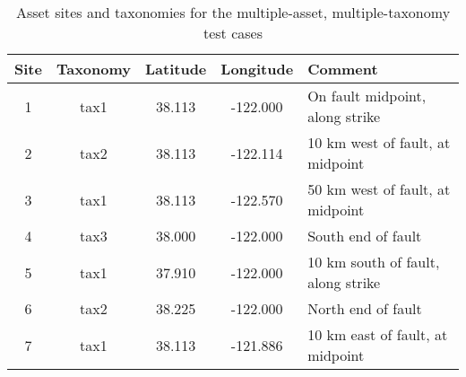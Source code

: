\begin{table}

\centering
\begin{tabular}{ c c c c l }

\hline
\rowcolor{anti-flashwhite}
\bf{Site} & \bf{Taxonomy} & \bf{Latitude} & \bf{Longitude} & \bf{Comment} \\
\hline
1 & tax1 & 38.113 & -122.000 & On fault midpoint, along strike \\
2 & tax2 & 38.113 & -122.114 & 10 km west of fault, at midpoint \\
3 & tax1 & 38.113 & -122.570 & 50 km west of fault, at midpoint \\
4 & tax3 & 38.000 & -122.000 & South end of fault \\
5 & tax1 & 37.910 & -122.000 & 10 km south of fault, along strike \\
6 & tax2 & 38.225 & -122.000 & North end of fault \\
7 & tax1 & 38.113 & -121.886 & 10 km east of fault, at midpoint \\
\hline
\end{tabular}

\caption{Asset sites and taxonomies for the multiple-asset, multiple-taxonomy test cases}
\label{tab:assets-tax3}
\end{table}